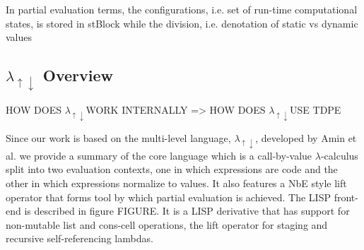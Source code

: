 \documentclass{article}
\theoremstyle{definition}
\newcommand{\mslang}{$\lambda_{\uparrow\downarrow}$}
\begin{document}
In partial evaluation terms, the configurations, i.e. set of run-time computational states, is stored in stBlock while the division, i.e. denotation of static vs dynamic values 

\subsection{\texorpdfstring{\mslang}{Lg} Overview}
HOW DOES \mslang WORK INTERNALLY => HOW DOES \mslang USE TDPE

Since our work is based on the multi-level language, \mslang, developed by Amin et al. \cite{amin2017collapsing} we provide a summary of the core language which is a call-by-value $\lambda$-calculus split into two evaluation contexts, one in which expressions are code and the other in which expressions normalize to values. It also features a NbE style lift operator that forms tool by which partial evaluation is achieved. The LISP front-end is described in figure FIGURE. It is a LISP derivative that has support for non-mutable list and cons-cell operations, the lift operator for staging and recursive self-referencing lambdas.

\end{document}
